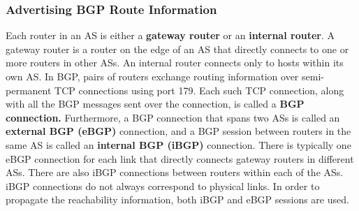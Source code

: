 \subsubsection{Advertising BGP Route Information}
Each router in an AS is either a \textbf{gateway router} or an \textbf{internal router}. A gateway router is a router on the edge of an AS that directly connects to one or more routers in other ASs. An internal router connects only to hosts within its own AS. In BGP, pairs of routers exchange routing information over semi-permanent TCP connections using port 179. Each such TCP connection, along with all the BGP messages sent over the connection, is called a \textbf{BGP connection.} Furthermore, a BGP connection that spans two ASs is called an \textbf{external BGP (eBGP)} connection, and a BGP session between routers in the same AS is called an \textbf{internal BGP (iBGP)} connection.  There is typically one eBGP connection for each link that directly connects gateway routers in different ASs. There are also iBGP connections between routers within each of the ASs. iBGP connections do not always correspond to physical links. In order to propagate the reachability information, both iBGP and eBGP sessions are used.

